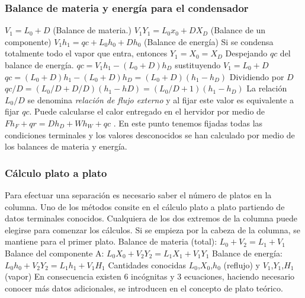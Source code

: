 \documentclass[11pt,openany]{book}
\begin{document}
\subsubsection{Balance de materia y energía para el condensador}
$V_1 = L_0 + D$ (Balance de materia.)
\newline\newline
$V_1 Y_1= L_0 x_0 + D X_D$ (Balance de un componente)
\newline\newline
$V_1 h_1 = qc + L_0 h_0 + D h_0$ (Balance de energía)
\newline\newline
Si se condensa totalmente todo el vapor que entra, entonces
\newline\newline
$Y_1 = X_0 = X_D$
Despejando $qc$ del balance de energía.
$qc = V_1 h_1 - (L_0+D)h_D$
\newline\newline
sustituyendo $V_1=L_0 +D$
\newline\newline
$qc=(L_0+D)h_1 - (L_0+D)h_D = (L_0+D)(h_1-h_D)$
\newline\newline
Dividiendo por $D$
\newline\newline
$qc/D = (L_0/D + D/D)(h_1-hD)=(L_0/D +1)(h_1-h_D)$
\newline\newline
La relación $L_0/D$ se denomina \textit{relación de flujo externo} y al fijar este valor es equivalente a 
fijar $qc$. Puede calcularse el calor entregado en el hervidor por medio de 
$F h_F + qr = D h_D + W h_W + qc$ . En este punto tenemos fijadas todas las condiciones terminales y los valores 
desconocidos se han calculado por medio de los balances de materia y energía.
\subsubsection{Cálculo plato a plato}
Para efectuar una separación es necesario saber el número de platos en la columna.  
Uno de los métodos consite en el cálculo plato a plato partiendo de datos terminales conocidos.
Cualquiera de los dos extremos de la columna puede elegirse para comenzar los cálculos. Si se 
empieza por la cabeza de la columna, se mantiene para el primer plato.
\newline
Balance de materia (total): $L_0+V_2=L_1+V_1$
\newline \newline
Balance del componente A: $L_0 X_0 + V_2 Y_2 = L_1 X_1 + V_1 Y_1$
\newline \newline
Balance de energía: $L_0 h_0+V_2 Y_2=L_1 h_1+V_1 H_1$
\newline\newline
Cantidades conocidas $L_0$,$X_0$,$h_0$ (reflujo) y $V_1$,$Y_1$,$ H_1$ (vapor)
\newline\newline
En consecuencia existen 6 incógnitas y 3 ecuaciones, haciendo necesario conocer más datos 
adicionales, se introducen en el concepto de plato teórico.
\end{document}
